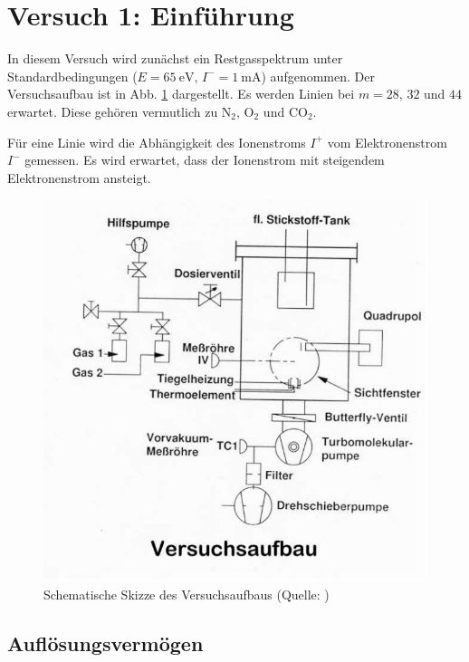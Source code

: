 \section{Versuch 1: Einführung}

In diesem Versuch wird zunächst ein Restgasspektrum unter Standardbedingungen ($E=\SI{65}{\electronvolt}, \, I^{-}=\SI{1}{\milli\ampere}$) aufgenommen. Der Versuchsaufbau ist in Abb. \ref{fig0v11} dargestellt.
Es werden Linien bei $m=28,\, 32$ und $44$ erwartet. Diese gehören vermutlich zu $\textrm{N}_{2}, \, \textrm{O}_{2}$ und $\textrm{CO}_{2}$.

Für eine Linie wird die Abhängigkeit des Ionenstroms $I^{+}$ vom Elektronenstrom $I^{-}$ gemessen. Es wird erwartet, dass der Ionenstrom mit steigendem Elektronenstrom ansteigt.

\begin{figure}[tb]
 \centering
 \includegraphics[scale=0.5]{./fig/massenspek_aufbau.png}
 \caption{Schematische Skizze des Versuchsaufbaus (Quelle: \cite[S. 4]{Litmap})}
 \label{fig0v11}
\end{figure}

\subsection{Auflösungsvermögen}

